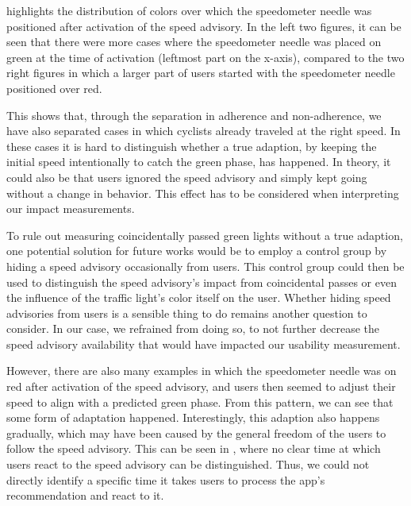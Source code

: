  highlights the distribution of colors over which the speedometer needle was positioned after activation of the speed advisory. In the left two figures, it can be seen that there were more cases where the speedometer needle was placed on green at the time of activation (leftmost part on the x-axis), compared to the two right figures in which a larger part of users started with the speedometer needle positioned over red. 

This shows that, through the separation in adherence and non-adherence, we have also separated cases in which cyclists already traveled at the right speed. In these cases it is hard to distinguish whether a true adaption, by keeping the initial speed intentionally to catch the green phase, has happened. In theory, it could also be that users ignored the speed advisory and simply kept going without a change in behavior. This effect has to be considered when interpreting our impact measurements. 

To rule out measuring coincidentally passed green lights without a true adaption, one potential solution for future works would be to employ a control group by hiding a speed advisory occasionally from users. This control group could then be used to distinguish the speed advisory's impact from coincidental passes or even the influence of the traffic light's color itself on the user. Whether hiding speed advisories from users is a sensible thing to do remains another question to consider. In our case, we refrained from doing so, to not further decrease the speed advisory availability that would have impacted our usability measurement.

However, there are also many examples in which the speedometer needle was on red after activation of the speed advisory, and users then seemed to adjust their speed to align with a predicted green phase. From this pattern, we can see that some form of adaptation happened. Interestingly, this adaption also happens gradually, which may have been caused by the general freedom of the users to follow the speed advisory. This can be seen in , where no clear time at which users react to the speed advisory can be distinguished. Thus, we could not directly identify a specific time it takes users to process the app's recommendation and react to it.

